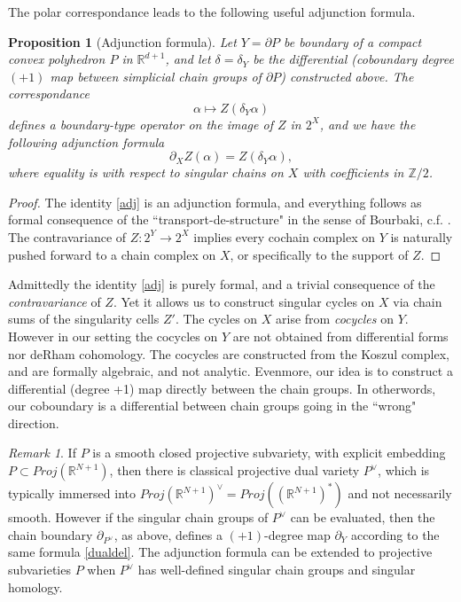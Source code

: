 \documentclass[12pt]{amsart}
\newtheorem{prop}{Proposition}
\theoremstyle{definition}
\theoremstyle{remark}
\newtheorem{rem}{Remark}
\newcommand{\bR}{\mathbb{R}}
\newcommand{\bZ}{\mathbb{Z}}
\newcommand{\del}{\partial}
\begin{document}
The polar correspondance leads to the following useful adjunction formula.
\begin{prop}[Adjunction formula]
Let $Y=\del P$ be boundary of a compact convex polyhedron $P$ in $\bR^{d+1}$, and let $\delta=\delta_Y$ be the differential (coboundary degree $(+1)$ map between simplicial chain groups of $\del P$) constructed above. The correspondance $$\alpha \mapsto Z(\delta_Y \alpha)$$ defines a boundary-type operator on the image of $Z$ in $2^X$, and we have the following adjunction formula \begin{equation}
\del_X Z(\alpha)=Z(\delta_Y \alpha),   \label{adj}
\end{equation} where equality is with respect to singular chains on $X$ with coefficients in $\bZ/2$. 
\end{prop}
\begin{proof}
The identity \eqref{adj} is an adjunction formula, and everything follows as formal consequence of the ``transport-de-structure" in the sense of Bourbaki, c.f. \cite[IV.1.5]{bourbaki}. The contravariance of $Z:2^Y \to 2^X$ implies every cochain complex on $Y$ is naturally pushed forward to a chain complex on $X$, or specifically to the support of $Z$. 
\end{proof}
Admittedly the identity \ref{adj} is purely formal, and a trivial consequence of the \emph{contravariance} of $Z$. Yet it allows us to construct singular cycles on $X$ via chain sums of the singularity cells $Z'$. The cycles on $X$ arise from \emph{cocycles} on $Y$. However in our setting the cocycles on $Y$ are not obtained from differential forms nor deRham cohomology. The cocycles are constructed from the Koszul complex, and are formally algebraic, and not analytic. Evenmore, our idea is to construct a differential (degree +1) map directly between the chain groups. In otherwords, our coboundary is a differential between chain groups going in the ``wrong" direction.  




\begin{rem} 
If $P$ is a smooth closed projective subvariety, with explicit embedding $P \subset Proj(\bR^{N+1})$, then there is classical projective dual variety $P^\vee$, which is typically immersed into $Proj(\bR^{N+1})^\vee=Proj((\bR^{N+1})^*)$ and not necessarily smooth. However if the singular chain groups of $P^\vee$ can be evaluated, then the chain boundary $\del_{P^\vee}$, as above, defines a $(+1)$-degree map $\del_Y$ according to the same formula \eqref{dualdel}. The adjunction formula can be extended to projective subvarieties $P$ when $P^\vee$ has well-defined singular chain groups and singular homology. 
\end{rem}
\end{document}
